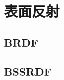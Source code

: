 \section{表面反射}\label{sec:表面反射}

\subsection{BRDF}\label{sub:BRDF}

\subsection{BSSRDF}\label{sub:BSSRDF}
